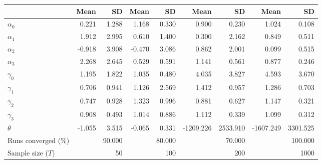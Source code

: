 
\begin{tabular}[t]{lrrrrrrrr}
\toprule
  & Mean & SD & Mean  & SD  & Mean   & SD   & Mean    & SD   \\
\midrule
$\alpha_{0}$ & 0.221 & 1.288 & 1.168 & 0.330 & 0.900 & 0.230 & 1.024 & 0.108\\
$\alpha_{1}$ & 1.912 & 2.995 & 0.610 & 1.400 & 0.300 & 2.162 & 0.849 & 0.511\\
$\alpha_{2}$ & -0.918 & 3.908 & -0.470 & 3.086 & 0.862 & 2.001 & 0.099 & 0.515\\
$\alpha_{3}$ & 2.268 & 2.645 & 0.529 & 0.591 & 1.141 & 0.561 & 0.877 & 0.246\\
$\gamma_{0}$ & 1.195 & 1.822 & 1.035 & 0.480 & 4.035 & 3.827 & 4.593 & 3.670\\
$\gamma_{1}$ & 0.706 & 0.941 & 1.126 & 2.569 & 1.412 & 0.957 & 1.286 & 0.703\\
$\gamma_{2}$ & 0.747 & 0.928 & 1.323 & 0.996 & 0.881 & 0.627 & 1.147 & 0.321\\
$\gamma_{3}$ & 0.908 & 0.493 & 1.014 & 0.886 & 1.112 & 0.339 & 1.099 & 0.312\\
$\theta$ & -1.055 & 3.515 & -0.065 & 0.331 & -1209.226 & 2533.910 & -1607.249 & 3301.525\\
Runs converged (\%) &  & 90.000 &  & 80.000 &  & 70.000 &  & 100.000\\
Sample size ($T$) &  & 50 &  & 100 &  & 200 &  & 1000\\
\bottomrule
\end{tabular}
